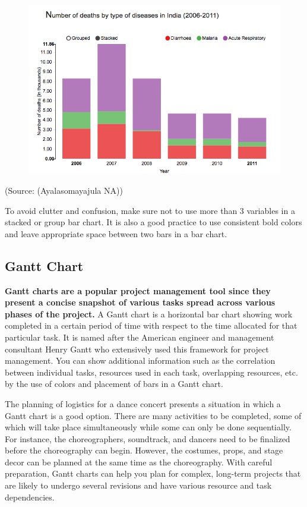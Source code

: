 \documentclass[]{book}
\begin{document}
\begin{figure}
\centering
\includegraphics{images/aya-bar2.png}
\caption{}
\end{figure}

(Source: (Ayalasomayajula NA))

To avoid clutter and confusion, make sure not to use more than 3
variables in a stacked or group bar chart. It is also a good practice to
use consistent bold colors and leave appropriate space between two bars
in a bar chart.

\subsection{Gantt Chart}\label{gantt-chart}

\textbf{Gantt charts are a popular project management tool since they
present a concise snapshot of various tasks spread across various phases
of the project.} A Gantt chart is a horizontal bar chart showing work
completed in a certain period of time with respect to the time allocated
for that particular task. It is named after the American engineer and
management consultant Henry Gantt who extensively used this framework
for project management. You can show additional information such as the
correlation between individual tasks, resources used in each task,
overlapping resources, etc. by the use of colors and placement of bars
in a Gantt chart.

The planning of logistics for a dance concert presents a situation in
which a Gantt chart is a good option. There are many activities to be
completed, some of which will take place simultaneously while some can
only be done sequentially. For instance, the choreographers, soundtrack,
and dancers need to be finalized before the choreography can begin.
However, the costumes, props, and stage decor can be planned at the same
time as the choreography. With careful preparation, Gantt charts can
help you plan for complex, long-term projects that are likely to undergo
several revisions and have various resource and task dependencies.
\end{document}
